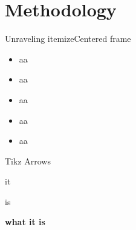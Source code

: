 \section{Methodology}

\begin{frame}[c]{Unraveling itemize}{Centered frame}

  \begin{center}
    \begin{minipage}{0.7\textwidth}
      \begin{itemize}
      \Large
      \item<1-> aa
      \item<2-> aa
      \item<3-> aa
      \item<4-> aa
      \item<5-> aa
      \end{itemize}
    \end{minipage}
  \end{center}

    
  \end{frame}


\begin{frame}[c]{Tikz Arrows}

  \begin{center}
        it

        \arrowdown

        is 

        \arrowdown

        \textbf{what it is}


  \end{center}

    
  \end{frame}

